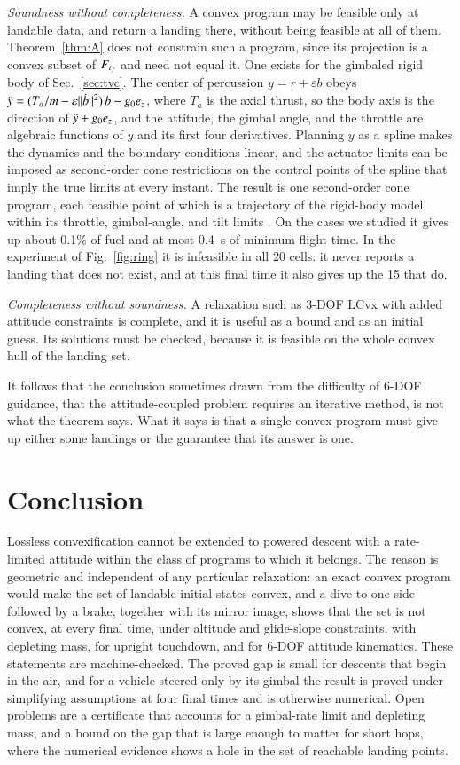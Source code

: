\emph{Soundness without completeness.} A convex program may be feasible only at landable data, and return a landing there,
without being feasible at all of them. Theorem~\ref{thm:A} does not constrain such a program, since its projection is a
convex subset of $F_{t_f}$ and need not equal it. One exists for the gimbaled rigid body of Sec.~\ref{sec:tvc}. The center of
percussion $y=r+\varepsilon b$ obeys $\ddot y=(T_a/m-\varepsilon\lVert \dot b\rVert^2)\,b-g_0e_z$, where $T_a$ is the axial
thrust, so the body axis is the direction of $\ddot y+g_0e_z$, and the attitude, the gimbal angle, and the throttle are
algebraic functions of $y$ and its first four derivatives. Planning $y$ as a spline makes the dynamics and the boundary
conditions linear, and the actuator limits can be imposed as second-order cone restrictions on the control points of the
spline that imply the true limits at every instant. The result is one second-order cone program, each feasible point of
which is a trajectory of the rigid-body model within its throttle, gimbal-angle, and tilt limits \cite{repo}. On the cases we studied it gives up about 0.1\% of
fuel and at most 0.4~s of minimum flight time. In the experiment of Fig.~\ref{fig:ring} it is infeasible in all 20
cells: it never reports a landing that does not exist, and at this final time it also gives up the 15 that do.

\emph{Completeness without soundness.} A relaxation such as 3-DOF LCvx with added attitude constraints is complete, and it
is useful as a bound and as an initial guess. Its solutions must be checked, because it is feasible on the whole convex hull
of the landing set.

It follows that the conclusion sometimes drawn from the difficulty of 6-DOF guidance, that the attitude-coupled problem
requires an iterative method, is not what the theorem says. What it says is that a single convex program must give up
either some landings or the guarantee that its answer is one.

\section{Conclusion}
Lossless convexification cannot be extended to powered descent with a rate-limited attitude within the class of programs
to which it belongs. The reason is geometric and independent of any particular relaxation: an exact convex program would
make the set of landable initial states convex, and a dive to one side followed by a brake, together with its mirror image,
shows that the set is not convex, at every final time, under altitude and glide-slope constraints, with depleting mass, for
upright touchdown, and for 6-DOF attitude kinematics. These statements are machine-checked. The proved gap is small for
descents that begin in the air, and for a vehicle steered only by its gimbal the result is proved under simplifying
assumptions at four final times and is otherwise numerical. Open problems are a certificate that accounts for a gimbal-rate
limit and depleting mass, and a bound on the gap that is large enough to matter for short hops, where the numerical
evidence shows a hole in the set of reachable landing points.

